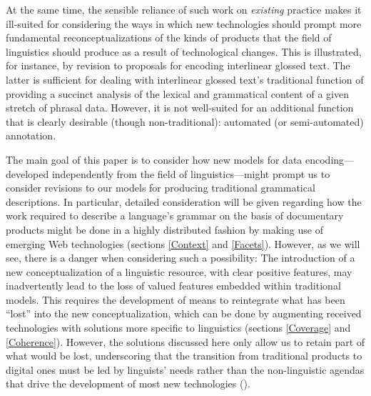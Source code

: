 At the same time, the sensible reliance of such work on \emph{existing} practice
makes it ill-suited for considering the ways in which new technologies should
prompt more fundamental reconceptualizations of the kinds of products that the
field of linguistics should produce as a result of technological changes. This
is illustrated, for instance, by  revision to
 proposals for encoding interlinear glossed text. The
latter is sufficient for dealing with interlinear glossed text's traditional
function of providing a succinct analysis of the lexical and grammatical content
of a given stretch of phrasal data. However, it is not well-suited for an
additional function that is clearly desirable (though non-traditional):
automated (or semi-automated) annotation.

The main goal of this paper is to consider how new models for data
encoding---developed independently from the field of linguistics---might prompt
us to consider revisions to our models for producing traditional grammatical
descriptions. In particular, detailed consideration will be given regarding how
the work required to describe a language's grammar on the basis of documentary
products might be done in a highly distributed fashion by making use of emerging
Web technologies (sections \ref{Context} and \ref{Facets}). However, as we will
see, there is a danger when considering such a possibility: The introduction of
a new conceptualization of a linguistic resource, with clear positive features,
may inadvertently lead to the loss of valued features embedded within
traditional models. This requires the development of means to reintegrate what
has been ``lost'' into the new conceptualization, which can be done by
augmenting received technologies with solutions more specific to linguistics
(sections \ref{Coverage} and \ref{Coherence}). However, the solutions discussed
here only allow us to retain part of what would be lost, underscoring that the
transition from traditional products to digital ones must be led by linguists'
needs rather than the non-linguistic agendas that drive the development of most
new technologies ().

